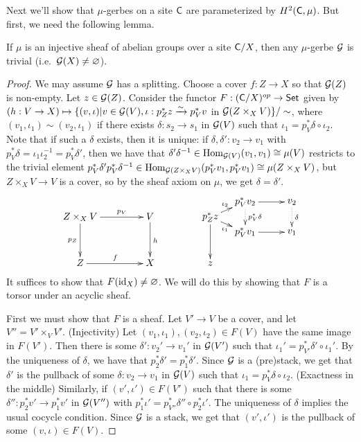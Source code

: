 Next we'll show that $\mu$-gerbes on a site $\text{\sf C}$ are parameterized by $H^2(\text{\sf C},\mu)$. But first, we need the following lemma. 
\begin{lemma}
 If $\mu$ is an injective sheaf of abelian groups over a site $\text{\sf C}/X$, then any $\mu$-gerbe $\mathcal{G}$ is trivial (i.e.~$\mathcal{G}(X)\neq\varnothing$). 
\end{lemma}
\begin{proof}
 We may assume $\mathcal{G}$ has a splitting. Choose a cover $f:Z\to X$ so that $\mathcal{G}(Z)$ is non-empty. Let $z\in \mathcal{G}(Z)$. Consider the functor $F:(\text{\sf C}/X)^{op}\to \text{\sf Set}$ given by $(h:V\to X)\mapsto \{(v,\iota)|v\in \mathcal{G}(V), \iota:p_Z^*z\xrightarrow\sim p_V^*v$ in $\mathcal{G}(Z\times_X V)\}/\sim$, where $(v_1,\iota_1)\sim(v_2,\iota_1)$ if there exists $\delta:s_2\to s_1$ in $\mathcal{G}(V)$ such that $\iota_1=p_V^*\delta\circ \iota_2$. Note that if such a $\delta$ exists, then it is unique: if $\delta,\delta':v_2\to v_1$ with $p_V^*\delta=\iota_1\iota_2^{-1}=p_V^*\delta'$, then we have that $\delta'\delta^{-1}\in \operatorname{Hom}_{\mathcal{G}(V)}(v_1,v_1)\cong \mu(V)$ restricts to the trivial element $p_V^*\delta'p_V^*\delta^{-1}\in \operatorname{Hom}_{\mathcal{G}(Z\times_X V)}(p_V^*v_1,p_V^*v_1)\cong \mu(Z\times_X V)$, but $Z\times_X V\to V$ is a cover, so by the sheaf axiom on $\mu$, we get $\delta=\delta'$.
 \[\xymatrix@!0 @R=4pc @C=6pc{
   Z\times_X V \ar[d]_{p_Z}\ar[r]^<>(.5){p_V} & V\ar[d]^h\\
   Z\ar[r]^f & X
 }\qquad\qquad
 \begin{xy}<1pc,0pc>:
   \ar (-1,0) *+{p_Z^*z}="Z"; (-1,-4) *+{z}
   \ar (2,1.3) *+{p_V^*v_2}="V2"; (6,1.3) *+{v_2}="v2"
   \ar (2,-1.3) *+{p_V^*v_1}="V1"; (6,-1.3) *+{v_1}="v1"
   \ar^{\iota_2} "Z";"V2"
   \ar_{\iota_1} "Z";"V1"
   \ar@{.>}^\delta "v2";"v1"
   \ar@{.>}^{p_V^*\delta} "V2";"V1"
 \end{xy}\]
 It suffices to show that $F(\operatorname{id}_X)\neq \varnothing$. We will do this by showing that $F$ is a torsor under an acyclic sheaf.

 First we must show that $F$ is a sheaf. Let $V'\to V$ be a cover, and let $V''=V'\times_V V'$. (Injectivity) Let $(v_1,\iota_1),(v_2,\iota_2)\in F(V)$ have the same image in $F(V')$. Then there is some $\delta':v_2'\to v_1'$ in $\mathcal{G}(V')$ such that $\iota_1'=p_{V'}^*\delta'\circ\iota_1'$. By the uniqueness of $\delta$, we have that $p_2^*\delta'=p_1^*\delta'$. Since $\mathcal{G}$ is a (pre)stack, we get that $\delta'$ is the pullback of some $\delta:v_2\to v_1$ in $\mathcal{G}(V)$ such that $\iota_1=p_V^*\delta\circ\iota_2$. (Exactness in the middle) Similarly, if $(v',\iota')\in F(V')$ such that there is some $\delta'':p_2^*v'\to p_1^*v'$ in $\mathcal{G}(V'')$ with $p_1^*\iota'=p_{V''}^*\delta''\circ p_2^*\iota'$. The uniqueness of $\delta$ implies the usual cocycle condition. Since $\mathcal{G}$ is a stack, we get that $(v',\iota')$ is the pullback of some $(v,\iota)\in F(V)$.


\end{proof}
